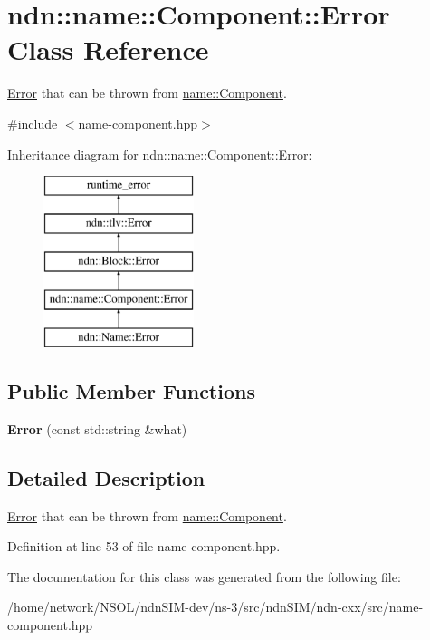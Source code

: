 \hypertarget{classndn_1_1name_1_1Component_1_1Error}{}\section{ndn\+:\+:name\+:\+:Component\+:\+:Error Class Reference}
\label{classndn_1_1name_1_1Component_1_1Error}


\hyperlink{classndn_1_1name_1_1Component_1_1Error}{Error} that can be thrown from \hyperlink{classndn_1_1name_1_1Component}{name\+::\+Component}.  




{\ttfamily \#include $<$name-\/component.\+hpp$>$}

Inheritance diagram for ndn\+:\+:name\+:\+:Component\+:\+:Error\+:\begin{figure}[H]
\begin{center}
\leavevmode
\includegraphics[height=5.000000cm]{classndn_1_1name_1_1Component_1_1Error}
\end{center}
\end{figure}
\subsection*{Public Member Functions}
\begin{DoxyCompactItemize}
\item 
{\bfseries Error} (const std\+::string \&what)\hypertarget{classndn_1_1name_1_1Component_1_1Error_abf824df6f9dc2f4aebcc25d58c142da2}{}\label{classndn_1_1name_1_1Component_1_1Error_abf824df6f9dc2f4aebcc25d58c142da2}

\end{DoxyCompactItemize}


\subsection{Detailed Description}
\hyperlink{classndn_1_1name_1_1Component_1_1Error}{Error} that can be thrown from \hyperlink{classndn_1_1name_1_1Component}{name\+::\+Component}. 

Definition at line 53 of file name-\/component.\+hpp.



The documentation for this class was generated from the following file\+:\begin{DoxyCompactItemize}
\item 
/home/network/\+N\+S\+O\+L/ndn\+S\+I\+M-\/dev/ns-\/3/src/ndn\+S\+I\+M/ndn-\/cxx/src/name-\/component.\+hpp\end{DoxyCompactItemize}
